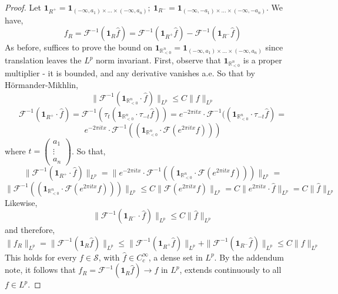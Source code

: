 \documentclass[12pt]{article}
\begin{document}
\begin{proof}
  Let $\mathbf{1}_{R^+} = \mathbf{1}_{(-\infty, a_1) \times \ldots \times (-\infty, a_n)};\ \mathbf{1}_{R^-} = \mathbf{1}_{(-\infty, -a_1) \times \ldots \times (-\infty, -a_n)}$.
  We have,
  $$
    f_R =
    \mathcal{F}^{-1}(\mathbf{1}_R \hat{f}) =
    \mathcal{F}^{-1}(\mathbf{1}_{R^+} \hat{f}) - \mathcal{F}^{-1}(\mathbf{1}_{R^-} \hat{f})
  $$
  As before, suffices to prove the bound on $\mathbf{1}_{\mathbb{R}^n_{< 0}} = \mathbf{1}_{(-\infty, a_1) \times \ldots \times (-\infty, a_n)}$ since translation leaves the $L^p$ norm invariant.
  First, observe that $\mathbf{1}_{\mathbb{R}^n_{< 0}}$ is a proper multiplier - it is bounded, and any derivative vanishes a.e. So that by Hörmander-Mikhlin,
  $$
    \|\mathcal{F}^{-1}( \mathbf{1}_{\mathbb{R}^n_{< 0}} \cdot \hat{f})\|_{L^p} \le
    C \|f\|_{L^p}
  $$
  $$
    \mathcal{F}^{-1}(\mathbf{1}_{R^+} \cdot \hat{f}) =
    \mathcal{F}^{-1}(\tau_t (\mathbf{1}_{\mathbb{R}^n_{< 0}} \cdot \tau_{-t}\hat{f})) =
    e^{-2\pi i t x} \cdot \mathcal{F}^{-1}( (\mathbf{1}_{\mathbb{R}^n_{< 0}} \cdot \tau_{-t}\hat{f}) =
  $$
  $$
    e^{-2\pi i t x} \cdot \mathcal{F}^{-1}( (\mathbf{1}_{\mathbb{R}^n_{< 0}} \cdot \mathcal{F}(e^{2\pi i t x}f)))
  $$
  where $t = \begin{pmatrix}
    a_1 \\
    \vdots \\
    a_n
  \end{pmatrix}$. So that,
  $$
    \|\mathcal{F}^{-1}(\mathbf{1}_{R^+} \cdot \hat{f})\|_{L^p} =
    \|e^{-2\pi i t x} \cdot \mathcal{F}^{-1}( (\mathbf{1}_{\mathbb{R}^n_{< 0}} \cdot \mathcal{F}(e^{2\pi i t x}f)))\|_{L^p} =
  $$
  $$
    \|\mathcal{F}^{-1}( (\mathbf{1}_{\mathbb{R}^n_{< 0}} \cdot \mathcal{F}(e^{2\pi i t x}f)))\|_{L^p} \le
    C \|\mathcal{F}(e^{2\pi i t x}f)\|_{L^p} =
    C \|e^{2\pi i t x} \cdot \hat{f}\|_{L^p} =
    C \|\hat{f}\|_{L^p}
  $$
  Likewise,
  $$
    \|\mathcal{F}^{-1}(\mathbf{1}_{R^-} \cdot \hat{f})\|_{L^p} \le
    C \|\hat{f}\|_{L^p}
  $$
  and therefore,
  $$
    \|f_R\|_{L^p} =
    \|\mathcal{F}^{-1}(\mathbf{1}_R \hat{f})\|_{L^p} \le
    \|\mathcal{F}^{-1}(\mathbf{1}_{R^+} \hat{f})\|_{L^p} + \|\mathcal{F}^{-1}(\mathbf{1}_{R^-} \hat{f})\|_{L^p} \le
    C \|f\|_{L^p}
  $$
  This holds for every $f \in \mathcal{S}$, with $\hat{f} \in C^\infty_c$, a dense set in $L^p$. By the addendum note, it follows that $f_R = \mathcal{F}^{-1}(\mathbf{1}_R \hat{f}) \rightarrow f$ in $L^p$, extends continuously to all $f \in L^p$.
\end{proof}
\end{document}
